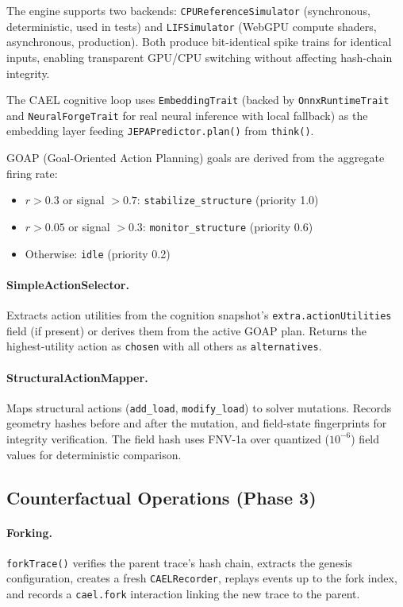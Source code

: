 \documentclass[sigconf,nonacm]{acmart}
\begin{document}
The engine supports two backends: \texttt{CPUReferenceSimulator}
(synchronous, deterministic, used in tests) and
\texttt{LIFSimulator} (WebGPU compute shaders, asynchronous,
production). Both produce bit-identical spike trains for identical
inputs, enabling transparent GPU/CPU switching without affecting
hash-chain integrity.

The CAEL cognitive loop uses \texttt{EmbeddingTrait} (backed by
\texttt{OnnxRuntimeTrait} and \texttt{NeuralForgeTrait} for real
neural inference with local fallback) as the embedding layer feeding
\texttt{JEPAPredictor.plan()} from \texttt{think()}.

GOAP (Goal-Oriented Action Planning) goals are derived from the
aggregate firing rate:
\begin{itemize}
  \item $r > 0.3$ or signal $> 0.7$: \texttt{stabilize\_structure} (priority 1.0)
  \item $r > 0.05$ or signal $> 0.3$: \texttt{monitor\_structure} (priority 0.6)
  \item Otherwise: \texttt{idle} (priority 0.2)
\end{itemize}

\paragraph{SimpleActionSelector.}
Extracts action utilities from the cognition snapshot's
\texttt{extra.actionUtilities} field (if present) or derives
them from the active GOAP plan. Returns the highest-utility
action as \texttt{chosen} with all others as \texttt{alternatives}.

\paragraph{StructuralActionMapper.}
Maps structural actions (\texttt{add\_load}, \texttt{modify\_load})
to solver mutations. Records geometry hashes before and after
the mutation, and field-state fingerprints for integrity
verification. The field hash uses FNV-1a over quantized
($10^{-6}$) field values for deterministic comparison.

\subsection{Counterfactual Operations (Phase 3)}

\paragraph{Forking.}
\texttt{forkTrace()} verifies the parent trace's hash chain,
extracts the genesis configuration, creates a fresh
\texttt{CAELRecorder}, replays events up to the fork index,
and records a \texttt{cael.fork} interaction linking the new
trace to the parent.
\end{document}
